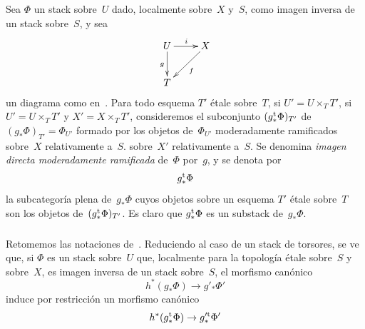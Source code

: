 \subsubsection{}
\label{XIII.2.2.1}
Sea $\Phi$ un stack sobre~$U$ dado, localmente sobre~$X$ y~$S$, como imagen
inversa de un stack sobre~$S$, y sea
$$
\xymatrix{ U \ar[r]^i
\ar[d]_g & X \ar[dl]^f \\ T }
$$
un diagrama como en~. Para todo esquema $T'$ étale sobre~$T$,
{si $U'=U\times_TT'$,}
{si $U'=U\times_TT'$ y $X'=X\times_TT'$,}
consideremos el subconjunto
$(g_*^{\mathrm{t}}\Phi)_{T'}$
\label{indnot:mg}%
de~$(g_*\Phi)_{T'}=\Phi_{U'}$ formado
por los objetos de~$\Phi_{U'}$ moderadamente ramificados
%
{sobre~$X$ relativamente a~$S$.}
{sobre~$X'$ relativamente a~$S$.}
Se denomina \emph{imagen directa
moderadamente ramificada}
%
%
de~$\Phi$ por~$g$, y se denota por
$$
g_*^{\mathrm{t}}\Phi
$$
la subcategoría plena de~$g_*\Phi$ cuyos objetos sobre un esquema $T'$ étale
sobre~$T$ son los objetos de~$(g_*^{\mathrm{t}}\Phi)_{T'}$. Es claro que
$g_*^{\mathrm{t}}\Phi$ es un substack de~$g_*\Phi$.

\subsubsection{}
\label{XIII.2.2.2}
{}
{Retomemos las notaciones de~. }
Reduciendo al caso de un stack de torsores, se ve que, si $\Phi$ es un stack
sobre~$U$ que, localmente para la topología étale sobre~$S$ y sobre~$X$, es
imagen inversa de un stack sobre~$S$, el morfismo canónico
$$
h^*(g_*\Phi)\to g'_*\Phi'
$$
induce por restricción un morfismo canónico
$$
h^*(g_*^{\mathrm{t}}\Phi)\to g_*^{\prime\mathrm{t}}\Phi'
$$

